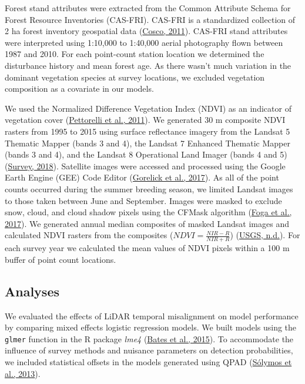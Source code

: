 \documentclass[
  12pt,
]{article}
\begin{document}
Forest stand attributes were extracted from the Common Attribute Schema for Forest Resource Inventories (CAS-FRI). CAS-FRI is a standardized collection of 2 ha forest inventory geospatial data (\protect\hyperlink{ref-Cumming2011a}{Cosco, 2011}). CAS-FRI stand attributes were interpreted using 1:10,000 to 1:40,000 aerial photography flown between 1987 and 2010. For each point-count station location we determined the disturbance history and mean forest age. As there wasn't much variation in the dominant vegetation species at survey locations, we excluded vegetation composition as a covariate in our models.

We used the Normalized Difference Vegetation Index (NDVI) as an indicator of vegetation cover (\protect\hyperlink{ref-pettorelliNormalizedDifferenceVegetation2011}{Pettorelli et al., 2011}). We generated 30 m composite NDVI rasters from 1995 to 2015 using surface reflectance imagery from the Landsat 5 Thematic Mapper (bands 3 and 4), the Landsat 7 Enhanced Thematic Mapper (bands 3 and 4), and the Landsat 8 Operational Land Imager (bands 4 and 5) (\protect\hyperlink{ref-geologicalsurveyLandsat47Surface2018}{Survey, 2018}). Satellite images were accessed and processed using the Google Earth Engine (GEE) Code Editor (\protect\hyperlink{ref-gorelickGoogleEarthEngine2017}{Gorelick et al., 2017}). As all of the point counts occurred during the summer breeding season, we limited Landsat images to those taken between June and September. Images were masked to exclude snow, cloud, and cloud shadow pixels using the CFMask algorithm (\protect\hyperlink{ref-fogaCloudDetectionAlgorithm2017}{Foga et al., 2017}). We generated annual median composites of masked Landsat images and calculated NDVI rasters from the composites (\(NDVI=\frac{NIR-R}{NIR+R}\)) (\protect\hyperlink{ref-USGS_NDVI}{USGS, n.d.}). For each survey year we calculated the mean values of NDVI pixels within a 100 m buffer of point count locations.

\hypertarget{analyses}{%
\subsection{Analyses}\label{analyses}}

We evaluated the effects of LiDAR temporal misalignment on model performance by comparing mixed effects logistic regression models. We built models using the \texttt{glmer} function in the R package \emph{lme4} (\protect\hyperlink{ref-batesFittingLinearMixedeffects2015}{Bates et al., 2015}). To accommodate the influence of survey methods and nuisance parameters on detection probabilities, we included statistical offsets in the models generated using QPAD (\protect\hyperlink{ref-SolymosMatsuoka2013}{Sólymos et al., 2013}).
\end{document}
